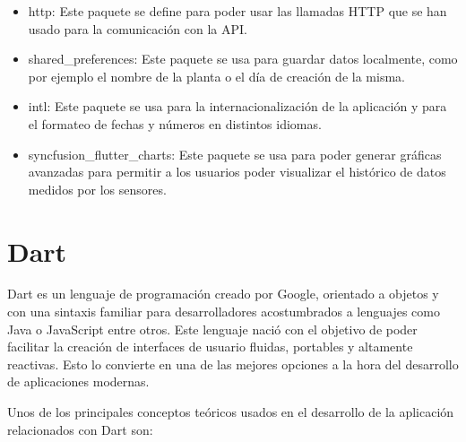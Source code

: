\begin{itemize}
    \begin{itemize}
        \item {http:} Este paquete se define para poder usar las llamadas HTTP que se han usado para la comunicación con la API.
        
        \item {shared\_preferences:} Este paquete se usa para guardar datos localmente, como por ejemplo el nombre de la planta o el día de creación de la misma.
        
        \item {intl:} Este paquete se usa para la internacionalización de la aplicación y para el formateo de fechas y números en distintos idiomas.
        
        \item {syncfusion\_flutter\_charts:} Este paquete se usa para poder generar gráficas avanzadas para permitir a los usuarios poder visualizar el histórico de datos medidos por los sensores.
    \end{itemize}

\end{itemize}

\section{Dart}
Dart es un lenguaje de programación creado por Google, orientado a objetos y con una sintaxis familiar para desarrolladores acostumbrados a lenguajes como Java o JavaScript entre otros. Este lenguaje nació con el objetivo de poder facilitar la creación de interfaces de usuario fluidas, portables y altamente reactivas. Esto lo convierte en una de las mejores opciones a la hora del desarrollo de aplicaciones modernas.

Unos de los principales conceptos teóricos usados en el desarrollo de la aplicación relacionados con Dart son:

